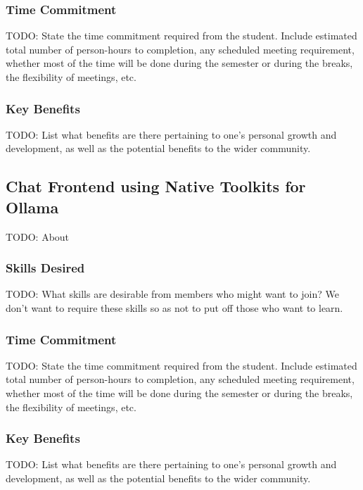 \documentclass[11pt,fleqn]{article}
\begin{document}
\subsubsection*{Time Commitment}

TODO: State the time commitment required from the student.  Include estimated total number of person-hours to completion, any scheduled meeting requirement, whether most of the time will be done during the semester or during the breaks, the flexibility of meetings, etc.

\subsubsection*{Key Benefits}

TODO: List what benefits are there pertaining to one's personal growth and development, as well as the potential benefits to the wider community.

\subsection{Chat Frontend using Native Toolkits for Ollama}

TODO: About

\subsubsection*{Skills Desired}

TODO: What skills are desirable from members who might want to join?  We don't want to require these skills so as not to put off those who want to learn.

\subsubsection*{Time Commitment}

TODO: State the time commitment required from the student.  Include estimated total number of person-hours to completion, any scheduled meeting requirement, whether most of the time will be done during the semester or during the breaks, the flexibility of meetings, etc.

\subsubsection*{Key Benefits}

TODO: List what benefits are there pertaining to one's personal growth and development, as well as the potential benefits to the wider community.
\end{document}
